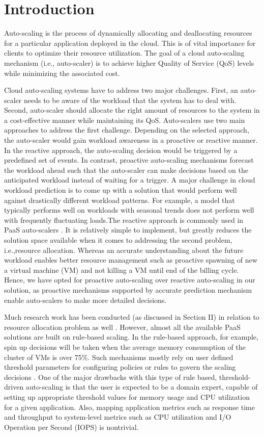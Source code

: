\section{Introduction}
Auto-scaling is the process of dynamically allocating and deallocating resources for a particular application deployed in the cloud. This is of vital importance for clients to optimize their resource utilization. The goal of a cloud auto-scaling mechanism (i.e., auto-scaler) is to achieve higher Quality of Service (QoS) levels while minimizing the associated cost.

Cloud auto-scaling systems have to address two major challenges. First, an auto-scaler needs to be aware of the workload that the system has to deal with. Second, auto-scaler should allocate the right amount of resources to the system in a cost-effective manner while maintaining its QoS. Auto-scalers use two main approaches to address the first challenge. Depending on the selected approach, the auto-scaler would gain workload awareness in a proactive or reactive manner. In the reactive approach, the auto-scaling decision would be triggered by a predefined set of events. In contrast, proactive auto-scaling mechanisms forecast the workload ahead such that the auto-scaler can make decisions based on the anticipated workload instead of waiting for a trigger. A major challenge in cloud workload prediction is to come up with a solution that would perform well against drastically different workload patterns. For example, a model that typically performs well on workloads with seasonal trends does not perform well with frequently fluctuating loads.The reactive approach is commonly used in PaaS auto-scalers \cite{website:openshift} \cite{website:bluemix}. It is relatively simple to implement, but greatly reduces the solution space available when it comes to addressing the second problem, i.e.,resource allocation. Whereas  an accurate understanding about the future workload enables better resource management such as proactive spawning of new a virtual machine (VM) and not killing a VM until end of the billing cycle. Hence, we have opted for proactive auto-scaling over reactive auto-scaling in our solution, as proactive mechanisms supported by accurate prediction mechanism enable auto-scalers to make more detailed decisions.

Much research work has been conducted (as discussed in Section II) in relation to resource allocation problem as well \cite{Roy_2011} \cite{Iqbal_2011}. However, almost all the available PaaS solutions are built on rule-based scaling. In the rule-based approach, for example, spin up decisions will be taken when the average memory consumption of the cluster of VMs is over 75\%. Such mechanisms mostly rely on user defined threshold parameters for configuring policies or rules to govern the scaling decisions \cite{modeldriven}. One of the major drawbacks with this type of rule based, threshold-driven auto-scaling is that the user is expected to be a domain expert, capable of setting up appropriate threshold values for memory usage and CPU utilization for a given application. Also, mapping application metrics such as response time and throughput to system-level metrics such as CPU utilization and I/O Operation per Second (IOPS) is nontrivial.

